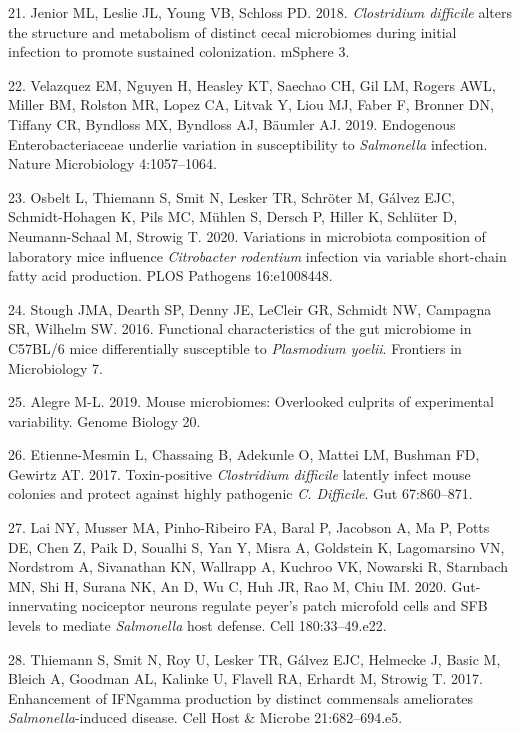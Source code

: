 \documentclass[
  11pt,
]{article}
\begin{document}
\leavevmode\hypertarget{ref-Jenior2018}{}%
21. Jenior ML, Leslie JL, Young VB, Schloss PD. 2018. \emph{Clostridium
difficile} alters the structure and metabolism of distinct cecal
microbiomes during initial infection to promote sustained colonization.
mSphere 3.

\leavevmode\hypertarget{ref-Velazquez2019}{}%
22. Velazquez EM, Nguyen H, Heasley KT, Saechao CH, Gil LM, Rogers AWL,
Miller BM, Rolston MR, Lopez CA, Litvak Y, Liou MJ, Faber F, Bronner DN,
Tiffany CR, Byndloss MX, Byndloss AJ, Bäumler AJ. 2019. Endogenous
Enterobacteriaceae underlie variation in susceptibility to
\emph{Salmonella} infection. Nature Microbiology 4:1057--1064.

\leavevmode\hypertarget{ref-Osbelt2020}{}%
23. Osbelt L, Thiemann S, Smit N, Lesker TR, Schröter M, Gálvez EJC,
Schmidt-Hohagen K, Pils MC, Mühlen S, Dersch P, Hiller K, Schlüter D,
Neumann-Schaal M, Strowig T. 2020. Variations in microbiota composition
of laboratory mice influence \emph{Citrobacter rodentium} infection via
variable short-chain fatty acid production. PLOS Pathogens 16:e1008448.

\leavevmode\hypertarget{ref-Stough2016}{}%
24. Stough JMA, Dearth SP, Denny JE, LeCleir GR, Schmidt NW, Campagna
SR, Wilhelm SW. 2016. Functional characteristics of the gut microbiome
in C57BL/6 mice differentially susceptible to \emph{Plasmodium yoelii}.
Frontiers in Microbiology 7.

\leavevmode\hypertarget{ref-Alegre2019}{}%
25. Alegre M-L. 2019. Mouse microbiomes: Overlooked culprits of
experimental variability. Genome Biology 20.

\leavevmode\hypertarget{ref-EtienneMesmin2017}{}%
26. Etienne-Mesmin L, Chassaing B, Adekunle O, Mattei LM, Bushman FD,
Gewirtz AT. 2017. Toxin-positive \emph{Clostridium difficile} latently
infect mouse colonies and protect against highly pathogenic \emph{C.
Difficile}. Gut 67:860--871.

\leavevmode\hypertarget{ref-Lai2020}{}%
27. Lai NY, Musser MA, Pinho-Ribeiro FA, Baral P, Jacobson A, Ma P,
Potts DE, Chen Z, Paik D, Soualhi S, Yan Y, Misra A, Goldstein K,
Lagomarsino VN, Nordstrom A, Sivanathan KN, Wallrapp A, Kuchroo VK,
Nowarski R, Starnbach MN, Shi H, Surana NK, An D, Wu C, Huh JR, Rao M,
Chiu IM. 2020. Gut-innervating nociceptor neurons regulate peyer's patch
microfold cells and SFB levels to mediate \emph{Salmonella} host
defense. Cell 180:33--49.e22.

\leavevmode\hypertarget{ref-Thiemann2017}{}%
28. Thiemann S, Smit N, Roy U, Lesker TR, Gálvez EJC, Helmecke J, Basic
M, Bleich A, Goodman AL, Kalinke U, Flavell RA, Erhardt M, Strowig T.
2017. Enhancement of IFNgamma production by distinct commensals
ameliorates \emph{Salmonella}-induced disease. Cell Host \& Microbe
21:682--694.e5.
\end{document}
